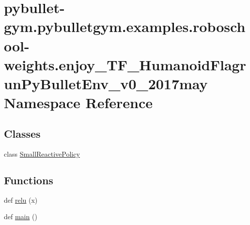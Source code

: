 \hypertarget{namespacepybullet-gym_1_1pybulletgym_1_1examples_1_1roboschool-weights_1_1enjoy___t_f___humanoid5ce30284d6415ebf8c921e22a512fe3a}{}\section{pybullet-\/gym.pybulletgym.\+examples.\+roboschool-\/weights.enjoy\+\_\+\+T\+F\+\_\+\+Humanoid\+Flagrun\+Py\+Bullet\+Env\+\_\+v0\+\_\+2017may Namespace Reference}
\label{namespacepybullet-gym_1_1pybulletgym_1_1examples_1_1roboschool-weights_1_1enjoy___t_f___humanoid5ce30284d6415ebf8c921e22a512fe3a}
\subsection*{Classes}
\begin{DoxyCompactItemize}
\item 
class \hyperlink{classpybullet-gym_1_1pybulletgym_1_1examples_1_1roboschool-weights_1_1enjoy___t_f___humanoid_flae868e0035df9ee869e3e34f002c52c1b}{Small\+Reactive\+Policy}
\end{DoxyCompactItemize}
\subsection*{Functions}
\begin{DoxyCompactItemize}
\item 
def \hyperlink{namespacepybullet-gym_1_1pybulletgym_1_1examples_1_1roboschool-weights_1_1enjoy___t_f___humanoid5ce30284d6415ebf8c921e22a512fe3a_a671ff15aec9ab6adcf5233993575322e}{relu} (x)
\item 
def \hyperlink{namespacepybullet-gym_1_1pybulletgym_1_1examples_1_1roboschool-weights_1_1enjoy___t_f___humanoid5ce30284d6415ebf8c921e22a512fe3a_a836475ee9ed6fd58b617cf7826ed1445}{main} ()
\end{DoxyCompactItemize}
